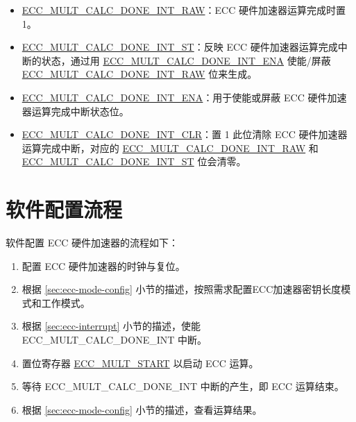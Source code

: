 \documentclass[main\_\_CN.tex]{subfiles}
\begin{document}
\begin{itemize}
    \item \hyperref[fielddesc:ECCMULTCALCDONEINTRAW]{ECC\_MULT\_CALC\_DONE\_INT\_RAW}：ECC 硬件加速器运算完成时置 1。
    \item \hyperref[fielddesc:ECCMULTCALCDONEINTST]{ECC\_MULT\_CALC\_DONE\_INT\_ST}：反映 ECC 硬件加速器运算完成中断的状态，通过用 \hyperref[fielddesc:ECCMULTCALCDONEINTENA]{ECC\_MULT\_CALC\_DONE\_INT\_ENA} 使能/屏蔽 \hyperref[fielddesc:ECCMULTCALCDONEINTRAW]{ECC\_MULT\_CALC\_DONE\_INT\_RAW} 位来生成。
    \item \hyperref[fielddesc:ECCMULTCALCDONEINTENA]{ECC\_MULT\_CALC\_DONE\_INT\_ENA}：用于使能或屏蔽 ECC 硬件加速器运算完成中断状态位。
    \item \hyperref[fielddesc:ECCMULTCALCDONEINTCLR]{ECC\_MULT\_CALC\_DONE\_INT\_CLR}：置 1 此位清除 ECC 硬件加速器运算完成中断，对应的 \hyperref[fielddesc:ECCMULTCALCDONEINTRAW]{ECC\_MULT\_CALC\_DONE\_INT\_RAW} 和 \hyperref[fielddesc:ECCMULTCALCDONEINTST]{ECC\_MULT\_CALC\_DONE\_INT\_ST} 位会清零。
\end{itemize}

\section{软件配置流程}
软件配置 ECC 硬件加速器的流程如下：
\begin{enumerate}
    \item 配置 ECC 硬件加速器的时钟与复位。
    \item 根据 \ref{sec:ecc-mode-config} 小节的描述，按照需求配置ECC加速器密钥长度模式和工作模式。
    \item 根据 \ref{sec:ecc-interrupt} 小节的描述，使能 ECC\_MULT\_CALC\_DONE\_INT 中断。
    \item 置位寄存器 \hyperref[fielddesc:ECCMULTSTART]{ECC\_MULT\_START} 以启动 ECC 运算。
    \item 等待 ECC\_MULT\_CALC\_DONE\_INT 中断的产生，即 ECC 运算结束。
    \item 根据 \ref{sec:ecc-mode-config} 小节的描述，查看运算结果。
\end{enumerate}



\end{document}
